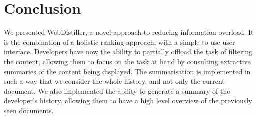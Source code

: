 \section{Conclusion}\label{sec:conclusion}
We presented WebDistiller, a novel approach to reducing information overload. It is the combination of a holistic ranking approach, with a simple to use user interface. Developers have now the ability to partially offload the task of filtering the content, allowing them to focus on the task at hand by consulting extractive summaries of the content being displayed. The summarisation is implemented in such a way that we consider the whole history, and not only the current document. We also implemented the ability to generate a summary of the developer's history, allowing them to have a high level overview of the previously seen documents. 